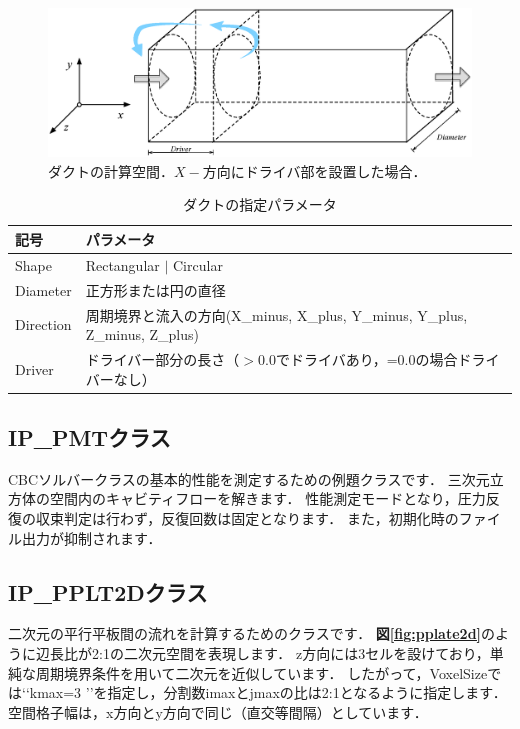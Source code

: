 \begin{figure}[htdp]
\begin{center}
\includegraphics[width=16cm,clip]{Duct.eps}
\end{center}
\caption{ダクトの計算空間．$X-$方向にドライバ部を設置した場合．}
\label{fig:ip_duct}
\end{figure}

\begin{table}[htdp]
\small
\caption{ダクトの指定パラメータ}
\begin{center}
\begin{tabular}{ll}\toprule
記号 & パラメータ\\ \midrule
Shape & Rectangular $|$ Circular\\ \hline
Diameter & 正方形または円の直径\\
Direction & 周期境界と流入の方向(X\_minus, X\_plus, Y\_minus, Y\_plus, Z\_minus, Z\_plus)\\
Driver & ドライバー部分の長さ（$>0.0$でドライバあり，=0.0の場合ドライバーなし）\\
\bottomrule
\end{tabular}
\end{center}
\label{tbl:ip_duct}
\end{table}


%
\subsection{IP\_PMTクラス}
CBCソルバークラスの基本的性能を測定するための例題クラスです．
三次元立方体の空間内のキャビティフローを解きます．
性能測定モードとなり，圧力反復の収束判定は行わず，反復回数は固定となります．
また，初期化時のファイル出力が抑制されます．

%
\subsection{IP\_PPLT2Dクラス}
二次元の平行平板間の流れを計算するためのクラスです．
\textbf{図\ref{fig:pplate2d}}のように辺長比が2:1の二次元空間を表現します．
z方向には3セルを設けており，単純な周期境界条件を用いて二次元を近似しています．
したがって，VoxelSizeでは\lq\lq kmax=3 \rq\rq を指定し，分割数imaxとjmaxの比は2:1となるように指定します．
空間格子幅は，x方向とy方向で同じ（直交等間隔）としています．

